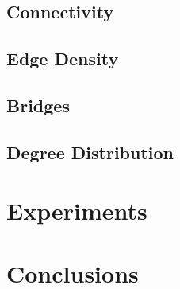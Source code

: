 \documentclass{llncs}
\begin{document}
\subsection{Connectivity}
\subsection{Edge Density}
\subsection{Bridges}
\subsection{Degree Distribution}
%
\section{Experiments}
%
\section{Conclusions}
%
\begin{thebibliography}{}
	
\end{thebibliography}
\end{document}
